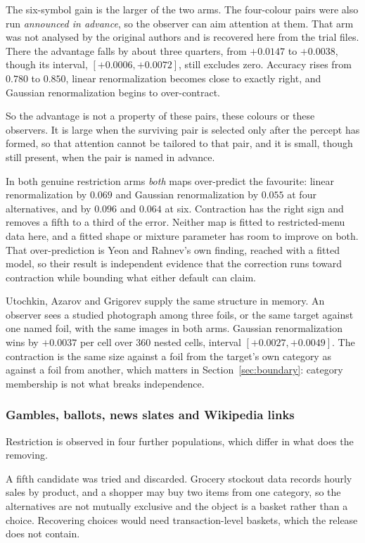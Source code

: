 \documentclass[11pt]{article}
\theoremstyle{italichead}
\begin{document}
The six-symbol gain is the larger of the two arms. The four-colour pairs were also run
\emph{announced in advance}, so the observer can aim attention at them. That arm was not analysed by the original authors and is
recovered here from the trial files. There the advantage falls by about three quarters, from
$+0.0147$ to $+0.0038$, though its interval, $[+0.0006, +0.0072]$, still excludes
zero. Accuracy rises from $0.780$ to $0.850$, linear renormalization becomes close to exactly
right, and Gaussian renormalization begins to over-contract.

So the advantage is not a property of these pairs, these colours or these observers. It is large
when the surviving pair is selected only after the percept has formed, so that attention cannot
be tailored to that pair, and it is small, though still present, when the pair is named in
advance.

In both genuine restriction arms \emph{both} maps over-predict the favourite: linear renormalization by $0.069$ and Gaussian renormalization by
$0.055$ at four alternatives, and by $0.096$ and $0.064$ at six. Contraction has the right
sign and removes a fifth to a third of the error. Neither map is fitted to restricted-menu
data here, and a fitted shape or mixture parameter has room to improve on both. That over-prediction is Yeon and
Rahnev's own finding, reached with a fitted model, so their result is independent evidence
that the correction runs toward contraction while bounding what either default can claim.

Utochkin, Azarov and Grigorev \cite{utochkin2025} supply the same structure in memory. An
observer sees a studied photograph among three foils, or the same target against one named
foil, with the same images in both arms. Gaussian renormalization wins by $+0.0037$ per cell over $360$
nested cells, interval $[+0.0027, +0.0049]$. The contraction is
the same size against a foil from the target's own category as against a foil from another,
which matters in Section~\ref{sec:boundary}: category membership is not what breaks
independence.

\subsubsection{Gambles, ballots, news slates and Wikipedia links}
\label{sec:more}

Restriction is observed in four further populations, which differ in what does the removing.

A fifth candidate was tried and discarded. Grocery stockout data records hourly sales by
product,
and a shopper may buy two items from one category, so the alternatives are not mutually
exclusive and the object is a basket rather than a choice. Recovering choices would need
transaction-level baskets, which the release does not contain.
\end{document}
